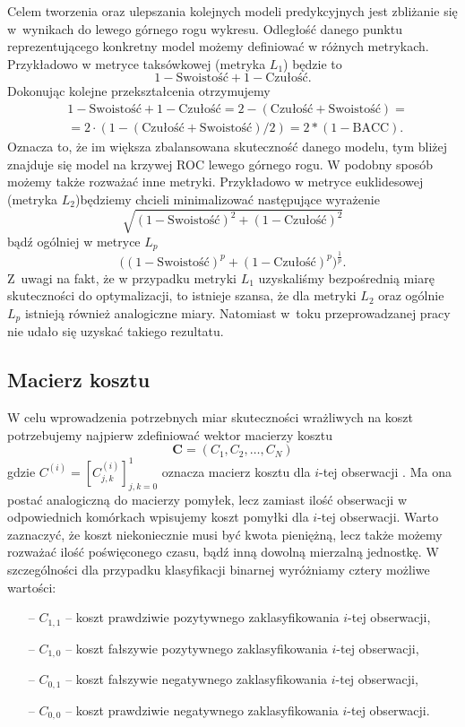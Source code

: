 \documentclass[inzynierska]{pwr_wmat_praca_dyplomowa}
\theoremstyle{plain}
\numberwithin{theorem}{chapter}
\theoremstyle{definition}
\numberwithin{theorem}{chapter}
\begin{document}
Celem tworzenia oraz ulepszania kolejnych modeli predykcyjnych jest zbliżanie się w~wynikach do lewego górnego rogu wykresu. Odległość danego punktu reprezentującego konkretny model możemy definiować w różnych metrykach. Przykładowo w metryce taksówkowej (metryka $L_1$) będzie to 
$$ 1 - \text{Swoistość} + 1 - \text{Czułość} \text{.}$$
Dokonując kolejne przekształcenia otrzymujemy
\begin{equation*}
	\begin{split}
		& 1 - \text{Swoistość} + 1 - \text{Czułość} = 2 - (\text{Czułość} + \text{Swoistość}) = \\
		& = 2 \cdot (1 - (\text{Czułość} + \text{Swoistość})/2) = 2*(1 - \text{BACC}) \text{.}
	\end{split}
\end{equation*}
Oznacza to, że im większa zbalansowana skuteczność danego modelu, tym bliżej znajduje się model na krzywej ROC lewego górnego rogu. W podobny sposób możemy także rozważać inne metryki. Przykładowo w metryce euklidesowej (metryka $L_2$)będziemy chcieli minimalizować następujące wyrażenie
$$ \sqrt{(1 - \text{Swoistość})^2 + (1 - \text{Czułość})^2} $$
bądź ogólniej w metryce $L_p$
$$ \big( (1 - \text{Swoistość})^p + (1 - \text{Czułość})^p \big)^{\frac{1}{p}} \text{.} $$
Z~uwagi na fakt, że w przypadku metryki $L_1$ uzyskaliśmy bezpośrednią miarę skuteczności do optymalizacji, to istnieje szansa, że dla metryki $L_2$ oraz ogólnie $L_p$ istnieją również analogiczne miary. Natomiast w~toku przeprowadzanej pracy nie udało się uzyskać takiego rezultatu. 

\subsection{Macierz kosztu}
\label{sec:macierz-kosztu}
W celu wprowadzenia potrzebnych miar skuteczności wrażliwych na koszt potrzebujemy najpierw zdefiniować wektor macierzy kosztu
$$ \boldsymbol{C} = (C_1, C_2, \dots, C_N) $$
gdzie $ C^{(i)} = [C^{(i)}_{j,k}]_{j,k=0}^1 $ oznacza macierz kosztu dla $i$-tej obserwacji \cite{CSCCFD, CS-Learning}. Ma ona postać analogiczną do macierzy pomyłek, lecz zamiast ilość obserwacji w odpowiednich komórkach wpisujemy koszt pomyłki dla $i$-tej obserwacji. Warto zaznaczyć, że koszt niekoniecznie musi być kwota pieniężną, lecz także możemy rozważać ilość poświęconego czasu, bądź inną dowolną mierzalną jednostkę. W szczególności dla przypadku klasyfikacji binarnej wyróżniamy cztery możliwe wartości:
\begin{itemize}
	\item[--] $C_{1,1}$ -- koszt prawdziwie pozytywnego zaklasyfikowania $i$-tej obserwacji,
	\item[--] $C_{1,0}$ -- koszt fałszywie pozytywnego zaklasyfikowania $i$-tej obserwacji,
	\item[--] $C_{0,1}$ -- koszt fałszywie negatywnego zaklasyfikowania $i$-tej obserwacji,
	\item[--] $C_{0,0}$ -- koszt prawdziwie negatywnego zaklasyfikowania $i$-tej obserwacji.
\end{itemize}
\end{document}
